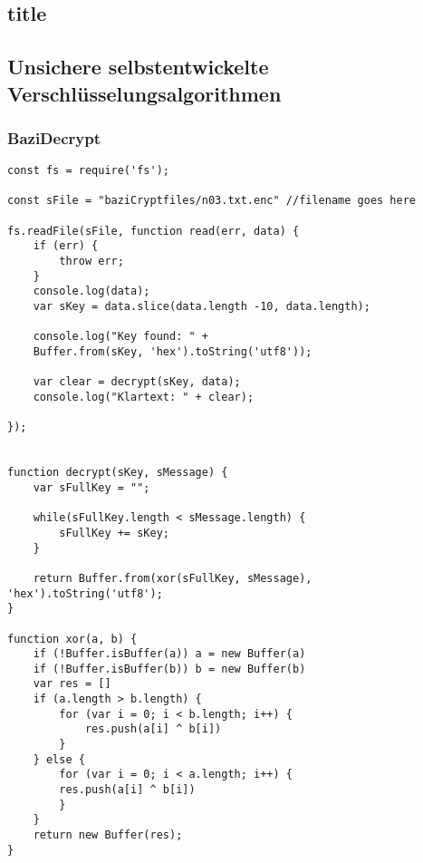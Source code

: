 \documentclass[12pt]{article}
\theoremstyle{plain}
\begin{document}
\subsection{title}
\subsection{Unsichere selbstentwickelte Verschlüsselungsalgorithmen}
\subsubsection{BaziDecrypt}
\begin{lstlisting}
const fs = require('fs');

const sFile = "baziCryptfiles/n03.txt.enc" //filename goes here

fs.readFile(sFile, function read(err, data) {
	if (err) {
		throw err;
	}
	console.log(data);
	var sKey = data.slice(data.length -10, data.length);

	console.log("Key found: " +
	Buffer.from(sKey, 'hex').toString('utf8'));

	var clear = decrypt(sKey, data);
	console.log("Klartext: " + clear);

});


function decrypt(sKey, sMessage) {
	var sFullKey = "";

	while(sFullKey.length < sMessage.length) {
		sFullKey += sKey;
	}

	return Buffer.from(xor(sFullKey, sMessage), 'hex').toString('utf8');
}

function xor(a, b) {
	if (!Buffer.isBuffer(a)) a = new Buffer(a)
	if (!Buffer.isBuffer(b)) b = new Buffer(b)
	var res = []
	if (a.length > b.length) {
		for (var i = 0; i < b.length; i++) {
			res.push(a[i] ^ b[i])
		}
	} else {
		for (var i = 0; i < a.length; i++) {
		res.push(a[i] ^ b[i])
		}
	}
	return new Buffer(res);
}
\end{lstlisting}
\end{document}
